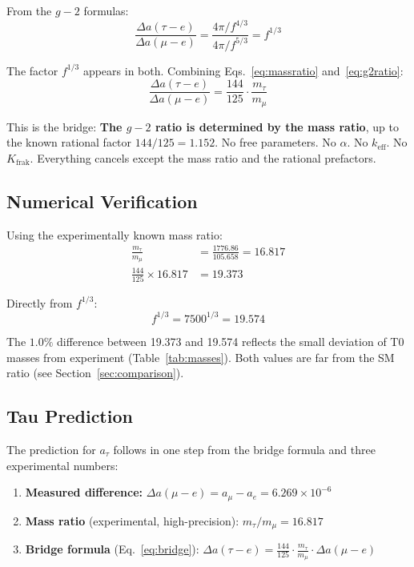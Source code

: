 From the $g-2$ formulas:
\begin{equation}
	\frac{\Delta a(\tau{-}e)}{\Delta a(\mu{-}e)} 
	= \frac{4\pi/f^{4/3}}{4\pi/f^{5/3}} = f^{1/3}
	\label{eq:g2ratio}
\end{equation}

The factor $f^{1/3}$ appears in both. Combining Eqs.~\ref{eq:massratio} and~\ref{eq:g2ratio}:
\begin{equation}
	\boxed{\frac{\Delta a(\tau{-}e)}{\Delta a(\mu{-}e)} = \frac{144}{125} \cdot \frac{m_\tau}{m_\mu}}
	\label{eq:bridge}
\end{equation}

This is the bridge: \textbf{The $g-2$ ratio is determined by the mass ratio}, up to the known rational factor $144/125 = 1.152$. No free parameters. No $\alpha$. No $k_\text{eff}$. No $K_\text{frak}$. Everything cancels except the mass ratio and the rational prefactors.

\subsection{Numerical Verification}

Using the experimentally known mass ratio:
\begin{align}
	\frac{m_\tau}{m_\mu} &= \frac{1776.86}{105.658} = 16.817 \\
	\frac{144}{125} \times 16.817 &= 19.373
\end{align}

Directly from $f^{1/3}$:
\begin{equation}
	f^{1/3} = 7500^{1/3} = 19.574
\end{equation}

The $1.0\%$ difference between 19.373 and 19.574 reflects the small deviation of T0 masses from experiment (Table~\ref{tab:masses}). Both values are far from the SM ratio (see Section~\ref{sec:comparison}).

\subsection{Tau Prediction}

The prediction for $a_\tau$ follows in one step from the bridge formula and three experimental numbers:

\begin{enumerate}
	\item \textbf{Measured difference:} $\Delta a(\mu{-}e) = a_\mu - a_e = 6.269 \times 10^{-6}$
	\item \textbf{Mass ratio} (experimental, high-precision): $m_\tau/m_\mu = 16.817$
	\item \textbf{Bridge formula} (Eq.~\ref{eq:bridge}): $\Delta a(\tau{-}e) = \frac{144}{125} \cdot \frac{m_\tau}{m_\mu} \cdot \Delta a(\mu{-}e)$
\end{enumerate}

